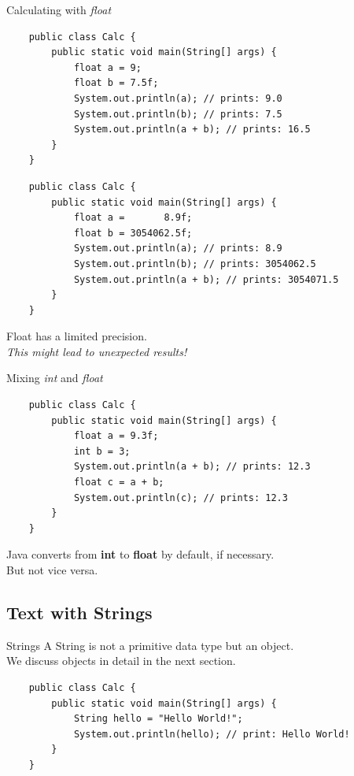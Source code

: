 \begin{frame}{Calculating with \emph{float}}
	\begin{lstlisting}
	public class Calc {
	    public static void main(String[] args) {
	        float a = 9;
	        float b = 7.5f;
	        System.out.println(a); // prints: 9.0
	        System.out.println(b); // prints: 7.5
	        System.out.println(a + b); // prints: 16.5
	    }
	}
	\end{lstlisting}
\framebreak
	\begin{lstlisting}
	public class Calc {
	    public static void main(String[] args) {
	        float a =       8.9f;
	        float b = 3054062.5f;
	        System.out.println(a); // prints: 8.9
	        System.out.println(b); // prints: 3054062.5
	        System.out.println(a + b); // prints: 3054071.5
	    }
	}
	\end{lstlisting}
	Float has a limited precision. \\
	\emph{This might lead to unexpected results!}
\end{frame}

\begin{frame}[fragile]{Mixing \emph{int} and \emph{float}}
	\begin{lstlisting}
	public class Calc {
	    public static void main(String[] args) {
	        float a = 9.3f;
	        int b = 3;
	        System.out.println(a + b); // prints: 12.3
	        float c = a + b;
	        System.out.println(c); // prints: 12.3
	    }
	}
	\end{lstlisting}
	Java converts from \textbf{int} to \textbf{float} by default, if necessary. \\
	But not vice versa.
\end{frame}

\subsection{Text with Strings}

\begin{frame}[fragile]{Strings}
	A String is not a primitive data type but an object. \\
	We discuss objects in detail in the next section.
	\begin{lstlisting}
	public class Calc {
	    public static void main(String[] args) {
	        String hello = "Hello World!";
	        System.out.println(hello); // print: Hello World!
	    }
	}
	\end{lstlisting}
\end{frame}

